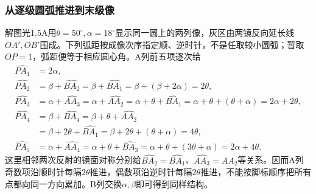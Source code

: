 \documentclass[UTF8,fontset=fandol,a4paper,11pt]{ctexart}
\begin{document}
\subsubsection*{从逐级圆弧推进到末级像}
解图光1.5A用$\theta=50^\circ,\alpha=18^\circ$显示同一圆上的两列像，灰区由两镜反向延长线$OA',OB'$围成。下列弧距按成像次序指定顺、逆时针，不是任取较小圆弧；暂取$OP=1$，弧距便等于相应圆心角。A列前五项逐次给
\[
\begin{aligned}
\widehat{PA_1}&=2\alpha,\\
\widehat{PA_2}&=\beta+\widehat{BA_2}
=\beta+\widehat{BA_1}=\beta+(\beta+2\alpha)=2\theta,\\
\widehat{PA_3}&=\alpha+\widehat{AA_3}
=\alpha+\widehat{AA_2}
=\alpha+\theta+\widehat{BA_1}
=\alpha+\theta+(\theta+\alpha)=2\alpha+2\theta,\\
\widehat{PA_4}&=\beta+\widehat{BA_4}
=\beta+\theta+\widehat{AA_2}\\
&=\beta+2\theta+\widehat{BA_1}
=\beta+2\theta+(\theta+\alpha)=4\theta,\\
\widehat{PA_5}&=\alpha+\widehat{AA_4}
=\alpha+\theta+\widehat{BA_3}
=\alpha+\theta+(3\theta+\alpha)=2\alpha+4\theta.
\end{aligned}
\]
这里相邻两次反射的镜面对称分别给$\widehat{BA_2}=\widehat{BA_1}$、$\widehat{AA_3}=\widehat{AA_2}$等关系。因而A列奇数项沿顺时针每隔$2\theta$推进，偶数项沿逆时针每隔$2\theta$推进，不能按脚标顺序把所有点都向同一方向累加。B列交换$\alpha,\beta$即可得到同样结构。
\end{document}
